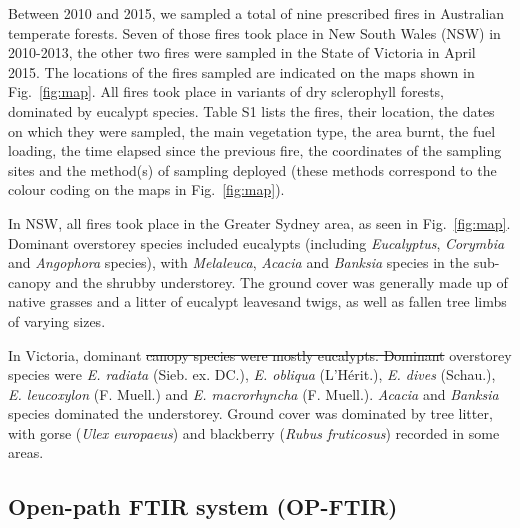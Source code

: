 \documentclass[acp, manuscript]{copernicus}
\providecommand{\DIFadd}[1]{{\protect\color{blue}\uwave{#1}}} %
\providecommand{\DIFdel}[1]{{\protect\color{red}\sout{#1}}}                      %
\providecommand{\DIFaddbegin}{} %
\providecommand{\DIFaddend}{} %
\providecommand{\DIFdelbegin}{} %
\providecommand{\DIFdelend}{} %
\begin{document}
Between 2010 and 2015, we sampled a total of nine prescribed fires in Australian temperate forests. Seven of those fires took place in New South Wales (NSW) in 2010-2013, the other two fires were sampled in the State of Victoria in April 2015. The locations of the fires sampled are indicated on the maps shown in Fig.~\ref{fig:map}. All fires took place in variants of dry sclerophyll forests, dominated by eucalypt species. Table S1 lists the fires, their location, the dates on which they were sampled, the main vegetation type, the area burnt, the fuel loading, the time elapsed since the previous fire, the coordinates of the sampling sites and the method(s) of sampling deployed (these methods correspond to the colour coding on the maps in Fig.~\ref{fig:map}). 

In NSW, all fires took place in the Greater Sydney area, as seen in Fig.~\ref{fig:map}. Dominant overstorey species included eucalypts (including \textit{Eucalyptus}, \textit{Corymbia} and \textit{Angophora} species), with \textit{Melaleuca}, \textit{Acacia} and \textit{Banksia} species in the sub-canopy and the shrubby understorey. The ground cover was generally made up of native grasses and a litter of eucalypt leaves\DIFaddbegin \DIFadd{, bark }\DIFaddend and twigs, as well as fallen tree limbs of varying sizes.

In Victoria, dominant \DIFdelbegin \DIFdel{canopy species were mostly eucalypts. Dominant }\DIFdelend overstorey species were \textit{E. radiata} (Sieb. ex. DC.), \textit{E. obliqua} (L'H\'erit.), \textit{E. dives} (Schau.), \textit{E. leucoxylon} (F. Muell.) 
and \textit{E. macrorhyncha} (F. Muell.). \textit{Acacia} and \textit{Banksia} species dominated the understorey. Ground cover was dominated by tree litter, with gorse (\textit{Ulex europaeus}) and blackberry (\textit{Rubus fruticosus}) recorded in some areas.


\subsection{Open-path FTIR system (OP-FTIR)}
\end{document}
